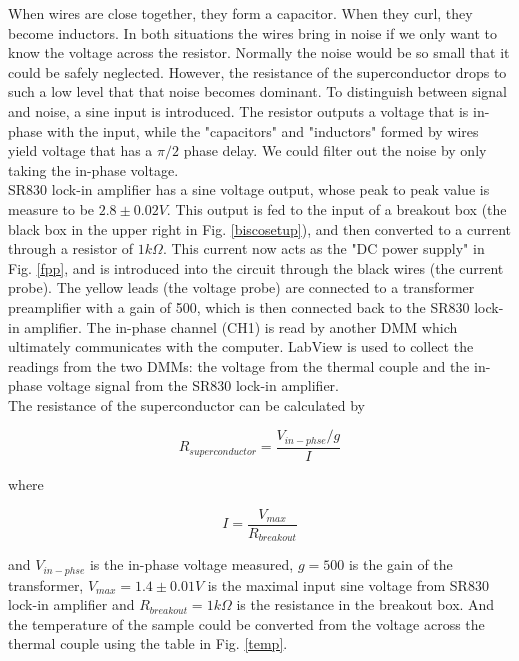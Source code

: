\documentclass[prb,preprint]{revtex4-1}
\begin{document}
When wires are close together, they form a capacitor. When they curl, they become inductors. In both situations the wires bring in noise if we only want to know the voltage across the resistor. Normally the noise would be so small that it could be safely neglected. However, the resistance of the superconductor drops to such a low level that that noise becomes dominant. To distinguish between signal and noise, a sine input is introduced. The resistor outputs a voltage that is in-phase with the input, while the "capacitors" and "inductors" formed by wires yield voltage that has a $\pi/2$ phase delay. We could filter out the noise by only taking the in-phase voltage. \\

SR830 lock-in amplifier has a sine voltage output, whose peak to peak value is measure to be $2.8 \pm 0.02 V$. This output is fed to the input of a breakout box (the black box in the upper right in Fig. \ref{biscosetup}), and then converted to a current through a resistor of $1k\Omega$. This current now acts as the "DC power supply" in Fig. \ref{fpp}, and is introduced into the circuit through the black wires (the current probe). The yellow leads (the voltage probe) are connected to a transformer preamplifier with a gain of 500, which is then connected back to the SR830 lock-in amplifier. The in-phase channel (CH1) is read by another DMM which ultimately communicates with the computer. LabView is used to collect the readings from the two DMMs: the voltage from the thermal couple and the in-phase voltage signal from the SR830 lock-in amplifier. \\

The resistance of the superconductor can be calculated by

\begin{equation}
R_{superconductor} = \frac{V_{in-phse}/g}{I}
\label{rofs}
\end{equation}

where

\begin{equation}
I=\frac{V_{max}}{R_{breakout}}
\label{current}
\end{equation}

and $V_{in-phse}$ is the in-phase voltage measured, $g=500$ is the gain of the transformer, $V_{max}=1.4\pm0.01V$ is the maximal input sine voltage from SR830 lock-in amplifier and $R_{breakout}=1k\Omega$ is the resistance in the breakout box. And the temperature of the sample could be converted from the voltage across the thermal couple using the table in Fig. \ref{temp}.\\
\end{document}
